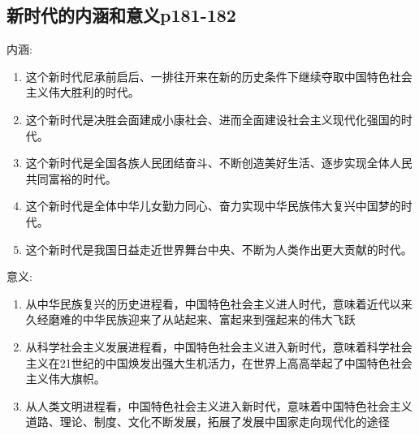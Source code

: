 \documentclass[UTF8]{ctexart}
\begin{document}
\subsection{新时代的内涵和意义p181-182}
\par 内涵:
\begin{enumerate}[(1)]
    \item 这个新时代尼承前启后、一排往开来在新的历史条件下继续夺取中国特色社会主义伟大胜利的时代。
    \item 这个新时代是决胜会面建成小康社会、进而全面建设社会主义现代化强国的时代。
    \item 这个新时代是全国各族人民团结奋斗、不断创造美好生活、逐步实现全体人民共同富裕的时代。
    \item 这个新时代是全体中华儿女勤力同心、奋力实现中华民族伟大复兴中国梦的时代。
    \item 这个新时代是我国日益走近世界舞台中央、不断为人类作出更大贡献的时代。
\end{enumerate}
\par 意义:
\begin{enumerate}[(1)]
    \item 从中华民族复兴的历史进程看，中国特色社会主义进人时代，意味着近代以来久经磨难的中华民族迎来了从站起来、富起来到强起来的伟大飞跃
    \item 从科学社会主义发展进程看，中国特色社会主义进入新时代，意味着科学社会主义在21世纪的中国焕发出强大生机活力，在世界上高高举起了中国特色社会主义伟大旗帜。
    \item 从人类文明进程看，中国特色社会主义进入新时代，意味着中国特色社会主义道路、理论、制度、文化不断发展，拓展了发展中国家走向现代化的途径
\end{enumerate}
\end{document}
